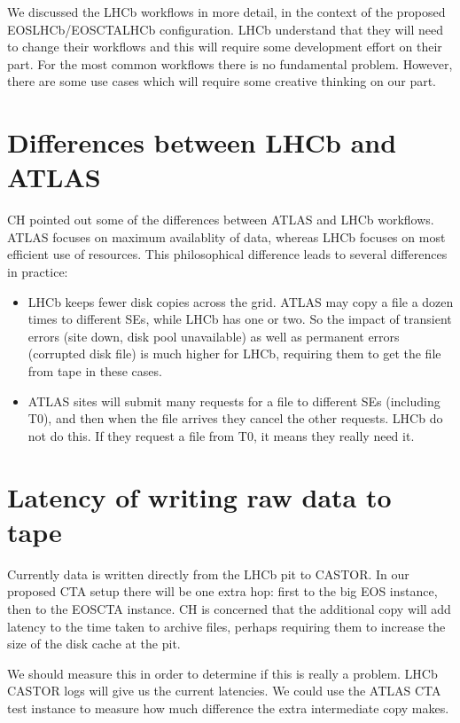 \documentclass{lhcb+cta}
\begin{document}

We discussed the LHCb workflows in more detail, in the context of the proposed EOSLHCb/EOSCTALHCb configuration. LHCb understand that they will need to change their workflows and this will require some development effort on their part. For the most common workflows there is no fundamental problem. However, there are some use cases which will require some creative thinking on our part.

\section*{Differences between LHCb and ATLAS}

CH pointed out some of the differences between ATLAS and LHCb workflows. ATLAS focuses on maximum availablity of data, whereas LHCb focuses on most efficient use of resources. This philosophical difference leads to several differences in practice:

\begin{itemize}
    \item LHCb keeps fewer disk copies across the grid. ATLAS may copy a file a dozen times to different SEs, while LHCb has one or two. So the impact of transient errors (site down, disk pool unavailable) as well as permanent errors (corrupted disk file) is much higher for LHCb, requiring them to get the file from tape in these cases.
    \item ATLAS sites will submit many requests for a file to different SEs (including T0), and then when the file arrives they cancel the other requests. LHCb do not do this. If they request a file from T0, it means they really need it.
\end{itemize}

\section*{Latency of writing raw data to tape}

Currently data is written directly from the LHCb pit to CASTOR. In our proposed CTA setup there will be one extra hop: first to the big EOS instance, then to the EOSCTA instance. CH is concerned that the additional copy will add latency to the time taken to archive files, perhaps requiring them to increase the size of the disk cache at the pit.

We should measure this in order to determine if this is really a problem. LHCb CASTOR logs will give us the current latencies. We could use the ATLAS CTA test instance to measure how much difference the extra intermediate copy makes.
\end{document}
